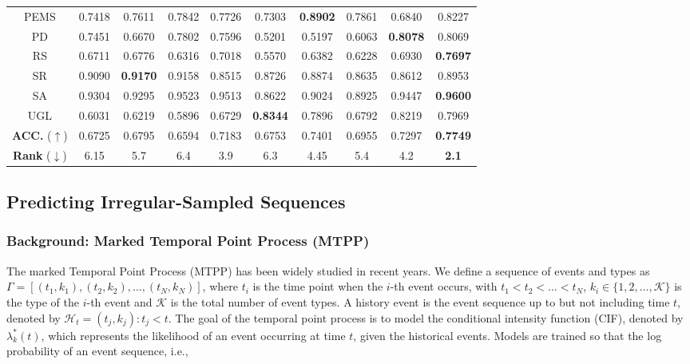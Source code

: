 \begin{table}[t]
{\begin{tabular}{cccccccccc}
        PEMS & 0.7418  & 0.7611  & 0.7842  & 0.7726  & 0.7303  & \textbf{0.8902}  & 0.7861  & 0.6840  & 0.8227  \\ 
        PD & 0.7451  & 0.6670  & 0.7802  & 0.7596  & 0.5201  & 0.5197  & 0.6063  & \textbf{0.8078}  & 0.8069  \\ 
        RS & 0.6711  & 0.6776  & 0.6316  & 0.7018  & 0.5570  & 0.6382  & 0.6228  & 0.6930  & \textbf{0.7697}  \\ 
        SR & 0.9090  & \textbf{0.9170}  & 0.9158  & 0.8515  & 0.8726  & 0.8874  & 0.8635  & 0.8612  & 0.8953  \\ 
        SA & 0.9304  & 0.9295  & 0.9523  & 0.9513  & 0.8622  & 0.9024  & 0.8925  & 0.9447  & \textbf{0.9600}  \\
        UGL & 0.6031  & 0.6219  & 0.5896  & 0.6729  & \textbf{0.8344}  & 0.7896  & 0.6792  & 0.8219  & 0.7969  \\
    \midrule
        \textbf{ACC.} ($\uparrow$) & 0.6725  & 0.6795  & 0.6594  & 0.7183  & 0.6753  & 0.7401  & 0.6955  & 0.7297  & \textbf{0.7749}  \\ 
        \textbf{Rank}  ($\downarrow$) & 6.15 & 5.7 & 6.4 & 3.9 & 6.3 & 4.45 & 5.4 & 4.2 & \textbf{2.1} \\
\bottomrule
\end{tabular}}
\label{tab:uea70}
\end{table}

\subsection{Predicting Irregular-Sampled Sequences} \label{sec:mtpp}

\subsubsection{Background: Marked Temporal Point Process (MTPP)}

The marked Temporal Point Process (MTPP) has been widely studied in recent years. We define a sequence of events and types as $\Gamma=[(t_1, k_1), (t_2, k_2), \ldots, (t_N, k_N)]$, where $t_i$ is the time point when the $i$-th event occurs, with $t_1 < t_2 < \ldots < t_N$, $k_i \in \{ 1, 2, \ldots, \mathcal{K} \}$ is the type of the $i$-th event and $\mathcal{K}$ is the total number of event types. A history event is the event sequence up to but not including time $t$, denoted by $\mathcal{H}_t={(t_j, k_j): t_j<t}$. The goal of the temporal point process is to model the conditional intensity function (CIF), denoted by $\lambda_{k}^{*}(t)$, which represents the likelihood of an event occurring at time $t$, given the historical events. Models are trained so that the log probability of an event sequence, i.e., 

